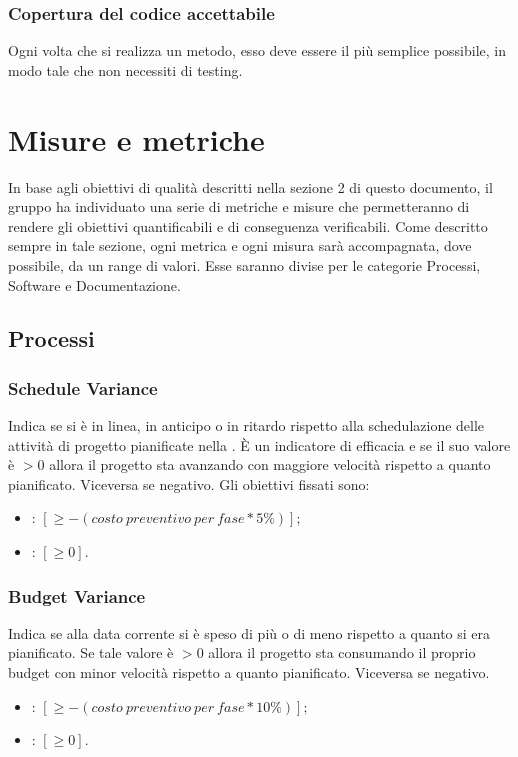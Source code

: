 \subsubsection{Copertura del codice accettabile}
Ogni volta che si realizza un metodo, esso deve essere il più semplice possibile, in modo tale che non necessiti di testing.

\newpage

\section{Misure e metriche}
In base agli obiettivi di qualità descritti nella sezione 2 di questo documento, il gruppo ha individuato una serie di metriche e misure che permetteranno di rendere gli obiettivi quantificabili e di conseguenza verificabili. Come descritto sempre in tale sezione, ogni metrica e ogni misura sarà accompagnata, dove possibile, da un range di valori. Esse saranno divise per le categorie Processi, Software e Documentazione. 

\subsection{Processi}
\subsubsection{Schedule Variance}
Indica se si è in linea, in anticipo o in ritardo rispetto alla schedulazione delle attività di progetto pianificate nella . È un indicatore di efficacia e se il suo valore è $> 0$ allora il progetto sta avanzando con maggiore velocità rispetto a quanto pianificato. Viceversa se negativo.
Gli obiettivi fissati sono:
\begin{itemize}
\item {}: $ [\geq -(costo\:preventivo\:per\:fase * 5\%)]; $
\item {}: $ [\geq 0]. $
\end{itemize}

\subsubsection{Budget Variance}
Indica se alla data corrente si è speso di più o di meno rispetto a quanto si era pianificato. Se tale valore è $>0$ allora il progetto sta consumando il proprio budget con minor velocità rispetto a quanto pianificato. Viceversa se negativo.
\begin{itemize}
\item {}: $[\geq -(costo\:preventivo\:per\:fase * 10\%)];$
\item {}: $[\geq 0].$
\end{itemize}

